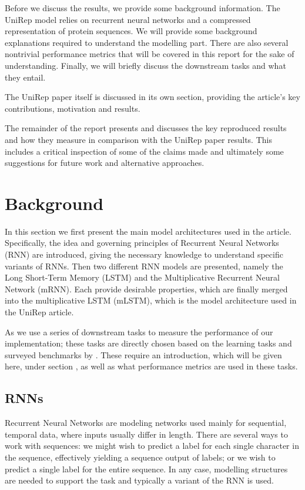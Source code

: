 \documentclass[a4paper,12pt]{article}
\begin{document}
Before we discuss the results, we provide some background information. The UniRep model relies on recurrent neural networks and a compressed representation of protein sequences. We will provide some background explanations required to understand the modelling part. There are also several nontrivial performance metrics that will be covered in this report for the sake of understanding. Finally, we will briefly discuss the downstream tasks and what they entail.

The UniRep paper itself is discussed in its own section, providing the article's key contributions, motivation and results.

The remainder of the report presents and discusses the key reproduced results and how they measure in comparison with the UniRep paper results. This includes a critical inspection of some of the claims made and ultimately some suggestions for future work and alternative approaches.


\clearpage
\section{Background}
\label{section:background}

In this section we first present the main model architectures used in the article. Specifically, the idea and governing principles of Recurrent Neural Networks (RNN) are introduced, giving the necessary knowledge to understand specific variants of RNNs. Then two different RNN models are presented, namely the Long Short-Term Memory (LSTM) and the Multiplicative Recurrent Neural Network (mRNN). Each provide desirable properties, which are finally merged into the multiplicative LSTM (mLSTM), which is the model architecture used in the UniRep article.

As we use a series of downstream tasks to measure the performance of our implementation; these tasks are directly chosen based on the learning tasks and surveyed benchmarks by \cite{tape2019}. These require an introduction, which will be given here, under section , as well as what performance metrics are used in these tasks.

\subsection{RNNs}
Recurrent Neural Networks are modeling networks used mainly for sequential, temporal data, where inputs usually differ in length. 
There are several ways to work with sequences: we might wish to predict a label for each single character in the sequence, effectively yielding a sequence output of labels; or we wish to predict a single label for the entire sequence. In any case, modelling structures are needed to support the task and typically a variant of the RNN is used.
\end{document}
